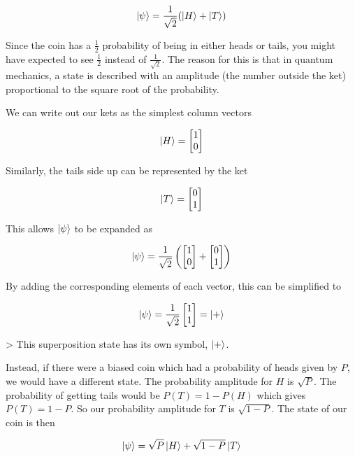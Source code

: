 \documentclass{book}
\begin{document}
$$
\ket{\psi} = \frac{1}{\sqrt{2}}(\ket{H} + \ket{T})
$$

Since the coin has a $\frac{1}{2}$ probability of being in either heads or tails, you might have expected to see $\frac{1}{2}$ instead of $\frac{1}{\sqrt{2}}$. The reason for this is that in quantum mechanics, a state is described with an amplitude (the number outside the ket) proportional to the square root of the probability. 

We can write out our kets as the simplest column vectors

$$
\ket{H} = 

\begin{bmatrix}
1 \\ 0
\end{bmatrix}
$$

Similarly, the tails side up can be represented by the ket

$$
\ket{T} = 

\begin{bmatrix}
0 \\ 1
\end{bmatrix}
$$

This allows $\ket{\psi} $ to be expanded as 

$$
\ket{\psi} = \frac{1}{\sqrt{2}}\left(\begin{bmatrix}
1 \\ 0
\end{bmatrix}+ \begin{bmatrix}
0 \\ 1
\end{bmatrix}\right)
$$

By adding the corresponding elements of each vector, this can be simplified to

$$ \ket{\psi} = \frac{1}{\sqrt{2}}\begin{bmatrix} 1 \\ 1 \end{bmatrix} = \ket{+}$$


> This superposition state has its own symbol, $\ket{+}$.

Instead, if there were a biased coin which had a probability of heads given by $P$, we would have a different state. The probability amplitude for $H$ is $\sqrt{P}$. The probability of getting tails would be $ P(T) = 1 - P(H)$ which gives $P(T) = 1 -P$. So our probability amplitude for $T$ is $\sqrt{1 - P}$. The state of our coin is then 

$$
\ket{\psi} = \sqrt{P}\ket{H} + \sqrt{1-P}\ket{T}
$$
\end{document}
